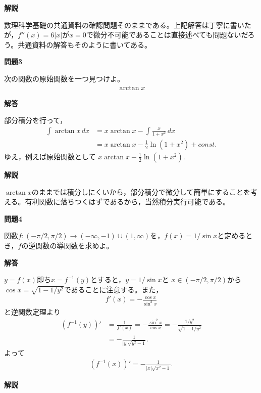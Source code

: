 \documentclass[a4paper,12pt,dvipdfmx,fleqn, oneside]{jsarticle}
\theoremstyle{defstyle}
\theoremstyle{thmx}
\theoremstyle{qesstyle}
\begin{document}
\textbf{解説}

数理科学基礎の共通資料の確認問題そのままである。上記解答は丁寧に書いたが，$f''(x)=6|x|$が$x=0$で微分不可能であることは直接述べても問題ないだろう。共通資料の解答もそのように書いてある。

\begin{shadebox}
    \textbf{問題3}

    \text{　}次の関数の原始関数を一つ見つけよ。
    \begin{align*}
        \arctan x
    \end{align*}
\end{shadebox}

\begin{screen}
    \textbf{解答}

    \text{　}部分積分を行って，
    \begin{align*}
        \int \arctan x \, dx & = x \arctan x - \int \frac{x}{1+x^2} \, dx        \\
                             & = x \arctan x - \frac{1}{2} \ln (1+ x^2) + const.
    \end{align*}
    ゆえ，例えば原始関数として $x \arctan x - \frac{1}{2} \ln (1+ x^2).  $
\end{screen}

\textbf{解説}

$\arctan x$のままでは積分しにくいから，部分積分で微分して簡単にすることを考える。有利関数に落ちつくはずであるから，当然積分実行可能である。

\begin{shadebox}
    \textbf{問題4}

    \text{　}関数$f:(-\pi/ 2, \pi / 2) \rightarrow (- \infty , -1) \cup (1, \infty)$を，$f(x)=1/\sin x$と定めるとき，$f$の逆関数の導関数を求めよ。
\end{shadebox}

\begin{screen}
    \textbf{解答}

    \text{　}$y=f(x)$即ち$x=f^{-1}(y)$とすると，$y=1/\sin x $と $x \in (-\pi /2 , \pi /2)$から$\cos x = \sqrt{1-1/y^2}$であることに注意する。また，
    \begin{align*}
        f'(x)=- \frac{\cos x}{\sin^2 x}
    \end{align*}
    と逆関数定理より
    \begin{align*}
        (f^{-1}(y))' & = \frac{1}{f'(x)}
        = - \frac{\sin ^2 x}{\cos x}              = - \frac{1/y^2}{\sqrt{1-1/y^2}} \\
                     & = - \frac{1}{|y|\sqrt{y^2-1}}.
    \end{align*}
    \text{　}よって
    \begin{align*}
        (f^{-1}(x))' = - \frac{1}{|x|\sqrt{x^2-1}}.
    \end{align*}
\end{screen}
\newpage
\textbf{解説}
\end{document}
